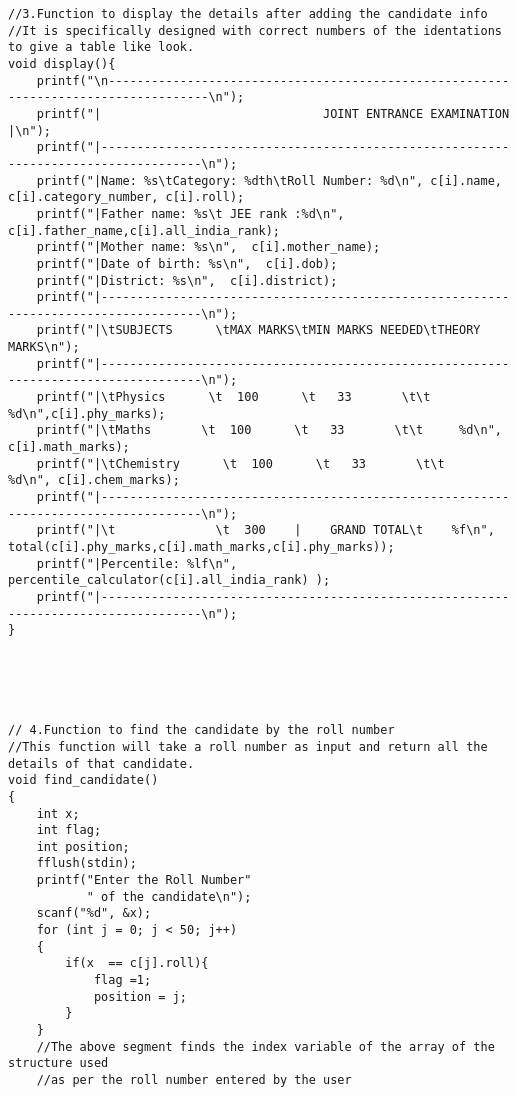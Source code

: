 \documentclass{article}
\begin{document}
\begin{FlushLeft}
\begin{verbatim}
//3.Function to display the details after adding the candidate info
//It is specifically designed with correct numbers of the identations to give a table like look.
void display(){
    printf("\n------------------------------------------------------------------------------------\n");
    printf("|                               JOINT ENTRANCE EXAMINATION                           |\n");
    printf("|------------------------------------------------------------------------------------\n");
    printf("|Name: %s\tCategory: %dth\tRoll Number: %d\n", c[i].name, c[i].category_number, c[i].roll);
    printf("|Father name: %s\t JEE rank :%d\n", c[i].father_name,c[i].all_india_rank);
    printf("|Mother name: %s\n",  c[i].mother_name);
    printf("|Date of birth: %s\n",  c[i].dob);
    printf("|District: %s\n",  c[i].district);
    printf("|------------------------------------------------------------------------------------\n");
    printf("|\tSUBJECTS      \tMAX MARKS\tMIN MARKS NEEDED\tTHEORY MARKS\n");
    printf("|------------------------------------------------------------------------------------\n");
    printf("|\tPhysics      \t  100      \t   33       \t\t     %d\n",c[i].phy_marks);
    printf("|\tMaths       \t  100      \t   33       \t\t     %d\n", c[i].math_marks);
    printf("|\tChemistry      \t  100      \t   33       \t\t     %d\n", c[i].chem_marks);
    printf("|------------------------------------------------------------------------------------\n");
    printf("|\t              \t  300    |    GRAND TOTAL\t    %f\n", total(c[i].phy_marks,c[i].math_marks,c[i].phy_marks));
    printf("|Percentile: %lf\n", percentile_calculator(c[i].all_india_rank) );
    printf("|------------------------------------------------------------------------------------\n");
}





// 4.Function to find the candidate by the roll number
//This function will take a roll number as input and return all the details of that candidate.
void find_candidate()
{
    int x;
    int flag;
    int position;
    fflush(stdin);
    printf("Enter the Roll Number"
           " of the candidate\n");
    scanf("%d", &x);
    for (int j = 0; j < 50; j++)
    {
        if(x  == c[j].roll){
            flag =1;
            position = j;
        }
    }
    //The above segment finds the index variable of the array of the structure used 
    //as per the roll number entered by the user 


\end{verbatim}
\end{FlushLeft}
\end{document}
